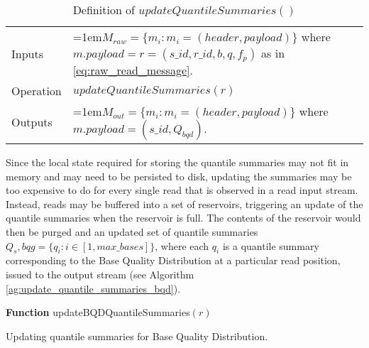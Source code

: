 \bgroup
\def\arraystretch{1.5}
\begin{table}[!ht]
    \caption{Definition of $updateQuantileSummaries()$}
    \label{tab:op_update_quantile_summaries}
    {\begin{tabular}{l|p{12cm}}
    \toprule
    Inputs & \hangindent=1em$M_{raw} = \{m_i: m_i = (header, payload)\}$ where $m.payload = r = (s\_id, r\_id, b, q, f_p)$ as in \ref{eq:raw_read_message}. \\
    \cline{2-2}
    Operation & $updateQuantileSummaries(r)$\\
    \cline{2-2}
    {Outputs} & \hangindent=1em$M_{out} = \{m_i: m_i = (header, payload)\}$ where $m.payload = (s\_id, Q_{bqd})$.\\
    \bottomrule
    \end{tabular}}
\end{table}
\egroup

Since the local state required for storing the quantile summaries may not fit in memory and may need to be persisted to disk, updating the summaries may be too expensive to do for every single read that is observed in a read input stream. Instead, reads may be buffered into a set of reservoirs, triggering an update of the quantile summaries when the reservoir is full. The contents of the reservoir would then be purged and an updated set of quantile summaries $Q_s,{bqg} = \{q_i: i\in [1,max\_bases]\}$, where each $q_i$ is a quantile summary corresponding to the Base Quality Distribution at a particular read position, issued to the output stream (see Algorithm \ref{ag:update_quantile_summaries_bqd}).

\begin{algorithm2e}[h]
\DontPrintSemicolon
\footnotesize
    \textbf{Function} {\sc updateBQDQuantileSummaries}$(r)$
\caption{Updating quantile summaries for Base Quality Distribution.}
\label{ag:update_quantile_summaries_bqd}
\end{algorithm2e}

